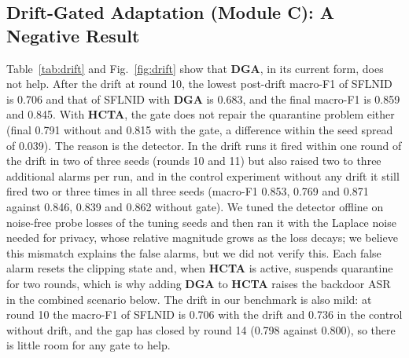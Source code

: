 \documentclass[journal]{IEEEtran}
\begin{document}
\subsection{Drift-Gated Adaptation (Module C): A Negative Result}
Table~\ref{tab:drift} and Fig.~\ref{fig:drift} show that \textbf{DGA}, in its current form, does not help. After the drift at round 10, the lowest post-drift macro-F1 of SFLNID is 0.706 and that of SFLNID with \textbf{DGA} is 0.683, and the final macro-F1 is 0.859 and 0.845. With \textbf{HCTA}, the gate does not repair the quarantine problem either (final 0.791 without and 0.815 with the gate, a difference within the seed spread of 0.039). The reason is the detector. In the drift runs it fired within one round of the drift in two of three seeds (rounds 10 and 11) but also raised two to three additional alarms per run, and in the control experiment without any drift it still fired two or three times in all three seeds (macro-F1 0.853, 0.769 and 0.871 against 0.846, 0.839 and 0.862 without gate). We tuned the detector offline on noise-free probe losses of the tuning seeds and then ran it with the Laplace noise needed for privacy, whose relative magnitude grows as the loss decays; we believe this mismatch explains the false alarms, but we did not verify this. Each false alarm resets the clipping state and, when \textbf{HCTA} is active, suspends quarantine for two rounds, which is why adding \textbf{DGA} to \textbf{HCTA} raises the backdoor ASR in the combined scenario below. The drift in our benchmark is also mild: at round 10 the macro-F1 of SFLNID is 0.706 with the drift and 0.736 in the control without drift, and the gap has closed by round 14 (0.798 against 0.800), so there is little room for any gate to help.

\begin{table}[!t]
\centering
\caption{Drift at Round 10 (No Attack): Macro-F1 at Round 9 (Pre), Lowest Macro-F1 After the Drift, Mean Macro-F1 After the Drift, and Final Macro-F1.}
\label{tab:drift}
\footnotesize
\renewcommand{\arraystretch}{1.1}
\setlength{\tabcolsep}{3pt}
\end{table}
\end{document}
